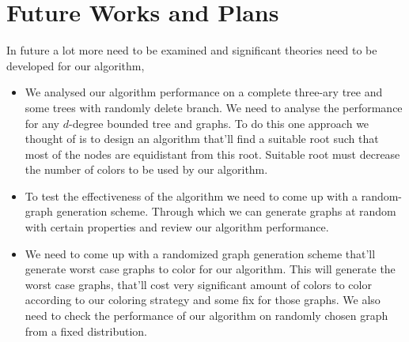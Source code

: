 \documentclass{article}
\theoremstyle{remark}
\begin{document}
\section{Future Works and Plans}
In future a lot more need to be examined and significant theories need to be developed for our algorithm,

\begin{itemize}
    \item We analysed our algorithm performance on a complete three-ary tree and some trees with randomly delete branch. We need to analyse the performance for any $d$-degree bounded tree and graphs. To do this one approach we thought of is to design an algorithm that'll find a suitable root such that most of the nodes are equidistant from this root. Suitable root must decrease the number of colors to be used by our algorithm.
    \item To test the effectiveness of the algorithm we need to come up with a random-graph generation scheme. Through which we can generate graphs at random with certain properties and review our algorithm performance.
    \item We need to come up with a randomized graph generation scheme that'll generate worst case graphs to color for our algorithm. This will generate the worst case graphs, that'll cost very significant amount of colors to color according to our coloring strategy and some fix for those graphs. We also need to check the performance of our algorithm on randomly chosen graph from a fixed distribution.
\end{itemize}
\end{document}
